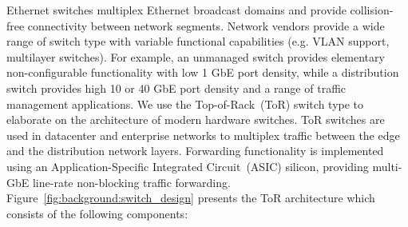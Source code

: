 Ethernet switches multiplex Ethernet broadcast domains and provide
collision-free connectivity between network segments.  Network vendors provide
a wide range of switch type with variable functional capabilities (e.g. VLAN
support, multilayer switches).  For example, an unmanaged switch provides
elementary non-configurable functionality with low 1 GbE port density, while a
distribution switch provides high 10 or 40 GbE port density and a range of
traffic management applications.  We use the Top-of-Rack~(ToR) switch type to
elaborate on the architecture of modern hardware switches.  ToR switches are
used in datacenter and enterprise networks to multiplex traffic between the
edge and the distribution network layers. Forwarding functionality is
implemented  using an Application-Specific Integrated Circuit~(ASIC) silicon,
providing multi-GbE line-rate non-blocking traffic forwarding.
Figure~\ref{fig:background:switch_design} presents the ToR architecture
which consists of the following components:

